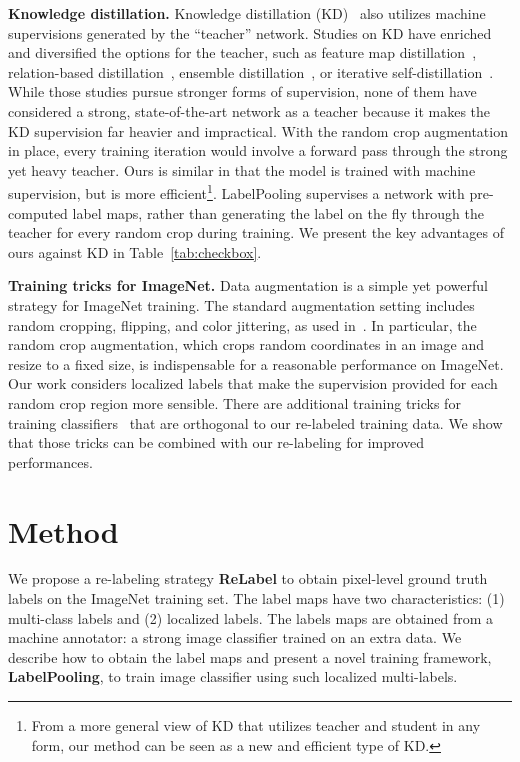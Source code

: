 \documentclass[final]{cvpr}
\newcommand\oursb{{\textbf{\mbox{ReLabel}}}\xspace}
\newcommand\ourframework{{{LabelPooling}}\xspace}
\newcommand\ourframeworkb{{\textbf{{LabelPooling}}}\xspace}
\begin{document}
\noindent\textbf{Knowledge distillation.}
Knowledge distillation (KD)~\cite{hinton2015distilling} also utilizes machine supervisions generated by the ``teacher'' network. 
Studies on KD have enriched and diversified the options for the teacher, such as feature map distillation~\cite{zagoruyko2016paying,heo2019AB,heo2019comprehensive}, relation-based distillation~\cite{park2019relational,tian2019contrastive}, ensemble distillation~\cite{shen2019meal,zhu2018knowledge}, or iterative self-distillation~\cite{furlanello2018born,yang2019snapshot,xie2020noisy_student}.
While those studies pursue stronger forms of supervision, none of them have considered a strong, state-of-the-art network as a teacher because it makes the KD supervision far heavier and impractical. With the random crop augmentation in place, every training iteration would involve a forward pass through the strong yet heavy teacher. 
Ours is similar in that the model is trained with machine supervision, but is more efficient\footnote{From a more general view of KD that utilizes teacher and student in any form, our method can be seen as a new and efficient type of KD.}. 
\ourframework supervises a network with pre-computed label maps, rather than generating the label on the fly through the teacher for every random crop during training. 
We present the key advantages of ours against KD in Table~\ref{tab:checkbox}.


\noindent\textbf{Training tricks for ImageNet.}
Data augmentation is a simple yet powerful strategy for ImageNet training.
The standard augmentation setting includes random cropping, flipping, and color jittering, as used in~\cite{pyramidnet,ghiasi2018dropblock,densenet,GoogleNet,yun2019cutmix,touvron2019fixing}. 
In particular, the random crop augmentation, which crops random coordinates in an image and resize to a fixed size, is indispensable for a reasonable performance on ImageNet. 
Our work considers localized labels that make the supervision provided for each random crop region more sensible.
There are additional training tricks for training classifiers~\cite{zhang2017mixup,yun2019cutmix,ghiasi2018dropblock,stochasticdepth,devries2017cutout} that are orthogonal to our re-labeled training data.
We show that those tricks can be combined with our re-labeling for improved performances.
 \section{Method}

We propose a re-labeling strategy \oursb to obtain pixel-level ground truth labels on the ImageNet training set. The label maps have two characteristics: (1) multi-class labels and (2) localized labels. The labels maps are obtained from a machine annotator: a strong image classifier trained on an extra data.
We describe how to obtain the label maps and present a novel training framework, \ourframeworkb, to train image classifier using such localized multi-labels.
\end{document}
